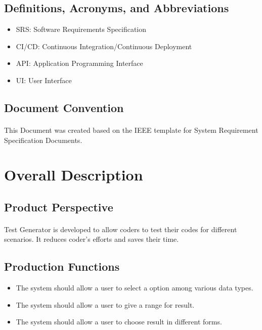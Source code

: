 \documentclass{article}
\begin{document}
\subsection{Definitions, Acronyms, and Abbreviations}
\begin{itemize}
    \item SRS: Software Requirements Specification
    \item CI/CD: Continuous Integration/Continuous Deployment
    \item API: Application Programming Interface
    \item UI: User Interface
\end{itemize}

\subsection{Document Convention}
\paragraph{}
This Document was created based on the IEEE template for System Requirement
Specification Documents.


\section{Overall Description}
\subsection{Product Perspective}
\paragraph{}
Test Generator is developed to allow coders to test their codes for different scenarios.
It reduces coder's efforts and saves their time.

\subsection{Production Functions}
\begin{itemize}
    \item The system should allow a user to select a option among various data types.
    \item The system should allow a user to give a range for result.
    \item The system should allow a user to choose result in different forms.
\end{itemize}
\end{document}
